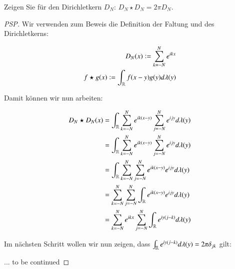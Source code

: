 
\begin{exercise}
	Zeigen Sie für den Dirichletkern $D_N$: $D_N \star D_N = 2\pi D_N$.
\end{exercise}

\begin{proof}[PSP]
	Wir verwenden zum Beweis die Definition der Faltung und des Dirichletkerns:
	
	\begin{eqnarray*}
	D_N(x) := \sum_{k=-N}^N e^{ikx} \\
	f \star g(x) := \int_{\mathbb{R} } f(x-y) g(y) d\lambda (y)
	\end{eqnarray*}

Damit können wir nun arbeiten:

\begin{equation*}
\begin{split}
D_N \star D_N(x) & = \int_{\mathbb{R}} \sum_{k=-N}^{N} e^{ik(x-y)} \sum_{j=-N}^{N} e^{ijy} d\lambda (y) \\
& = \int_{\mathbb{R}} \sum_{k=-N}^{N} e^{ik(x-y)} \sum_{j=-N}^{N} e^{ijy} d\lambda (y) \\
& = \int_{\mathbb{R}} \sum_{k=-N}^{N} \sum_{j=-N}^{N} e^{ik(x-y)} e^{ijy} d\lambda (y) \\
& = \sum_{k=-N}^{N} \sum_{j=-N}^{N} \int_{\mathbb{R}} e^{ik(x-y)} e^{ijy} d\lambda (y) \\
& = \sum_{k=-N}^{N} e^{ikx} \sum_{j=-N}^{N} \int_{\mathbb{R}} e^{iy(j-k)} d\lambda (y) \\
\end{split}
\end{equation*}

Im nächsten Schritt wollen wir nun zeigen, dass $\int_{\mathbb{R}} e^{iy(j-k)} d\lambda (y) = 2\pi \delta_{jk}$ gilt:

... to be continued
\end{proof}
